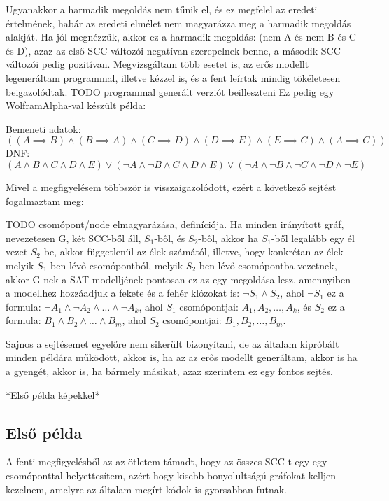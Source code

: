 \documentclass[
]{thesis-ekf}
\theoremstyle{definition}
\theoremstyle{remark}
\begin{document}
	Ugyanakkor a harmadik megoldás nem tűnik el, és ez megfelel az eredeti értelmének, habár az eredeti elmélet nem magyarázza meg a harmadik megoldás alakját. Ha jól megnézzük, akkor ez a harmadik megoldás: (nem A és nem B és C és D), azaz az első SCC változói negatívan szerepelnek benne, a második SCC változói pedig pozitívan. Megvizsgáltam több esetet is, az erős modellt legeneráltam programmal, illetve kézzel is, és a fent leírtak mindig tökéletesen beigazolódtak.
TODO programmal generált verziót beilleszteni
	Ez pedig egy WolframAlpha-val készült példa:
	
	Bemeneti adatok:
	\[ ((A\implies B)\wedge(B\implies A)\wedge(C\implies D)\wedge(D\implies E)\wedge(E\implies C)\wedge(A\implies C)) \]
	DNF:
	\[ (A\wedge B\wedge C\wedge D\wedge E)\vee (\neg A\wedge\neg B\wedge C\wedge D\wedge E)\vee (\neg A\wedge\neg B\wedge\neg C\wedge\neg D\wedge\neg E) \]
	
	Mivel a megfigyelésem többször is visszaigazolódott, ezért a következő sejtést fogalmaztam meg:
	
TODO csomópont/node elmagyarázása, definíciója.
	Ha minden irányított gráf, nevezetesen G, két SCC-ből áll, $ S_1 $-ből, és $ S_2 $-ből, akkor ha $ S_1 $-ből legalább egy él vezet $ S_2 $-be, akkor függetlenül az élek számától, illetve, hogy konkrétan az élek melyik $ S_1 $-ben lévő csomópontból, melyik $ S_2 $-ben lévő csomópontba vezetnek, akkor G-nek a SAT modelljének pontosan ez az egy megoldása lesz, amennyiben a modellhez hozzáadjuk a fekete és a fehér klózokat is: $ \neg S_1\wedge S_2 $, ahol $ \neg S_1 $ ez a formula: $\neg A_1 \wedge \neg A_2\wedge\dots\wedge\neg A_k$, ahol $ S_1 $ csomópontjai: $ A_1,A_2,\dots,A_k $, és $ S_2 $ ez a formula: $ B_1\wedge B_2\wedge\dots\wedge B_m $, ahol $ S_2 $ csomópontjai: $ B_1,B_2,\dots,B_m $.
	
	Sajnos a sejtésemet egyelőre nem sikerült bizonyítani, de az általam kipróbált minden példára működött, akkor is, ha az az erős modellt generáltam, akkor is ha a gyengét, akkor is, ha bármely másikat, azaz szerintem ez egy fontos sejtés.
	
	*Első példa képekkel*
	\subsection{Első példa}
	A fenti megfigyelésből az az ötletem támadt, hogy az összes SCC-t egy-egy csomóponttal helyettesítem, azért hogy kisebb bonyolultságú gráfokat kelljen kezelnem, amelyre az általam megírt kódok is gyorsabban futnak.
\end{document}
